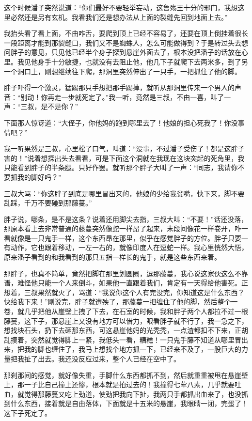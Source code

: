 这个时候潘子突然说道：“你们最好不要轻举妄动，这鲁殇王十分的邪门，我想这里必然还是另有玄机。我看我们还是想办法从上面的裂缝先回到地面上去。”

我抬头看了看上面，不由咋舌，要爬到顶上已经不容易了，还要在顶上倒挂着很长一段距离才能到那裂缝口，我们又不是蜘蛛人，怎么可能做得到？于是转过头去想问胖子的意见，只见他已经半个身子探到悬崖外面去了，根本没把潘子的话放在心里。我见他身手十分敏捷，也就没有去阻止他，他几下子就爬下去两米多，到了另一个洞口上，刚想继续往下爬，那洞里突然伸出了一只手，一把抓住了他的脚。

胖子吓得一个激灵，猛踢那只手想把那手踢掉，就听从那洞里传来一个男人的声音：“别动！你再走一步就死定了。”我一听，竟然是三叔，不由一喜，叫了一声：“三叔，是不是你？”

下面那人惊讶道：“大侄子，你他妈的跑到哪里去了！他娘的担心死我了！你没事情吧？”

我一听果然是三叔，心里松了口气，叫道：“没事，不过潘子受伤了！都是这胖子害的！”说着想探出头去看看，可是下面这个洞就在我现在这块突起的死角里，我只能看到胖子的半条腿。只好作罢。就听那个胖子大叫了一声：“同志，我请你不要抓我的脚好吗？”

三叔大骂：“你这胖子到底是哪里冒出来的，他娘的少给我贫嘴，快下来，脚不要乱踩，千万不要碰到那藤蔓。”

胖子说，哪条，是不是这条？说着还用脚尖去指，三叔大叫：“不要！”话还没落，那原本看上去非常普通的藤蔓突然像蛇一样昂了起来，末段间像花一样卷开，咋一看就像是一只鬼手一样，这个东西昂在那里，似乎在感觉胖子的方位。胖子只要一有动作，它也跟着移动，一左一右的，就像印度人在逗蛇一样。我心里恍然大悟，原来潘子看到的和我看到的那只五指一样长的鬼手，就是这些东西来着。

那胖子，也真不简单，竟然把脚在那里划圆圈，逗那藤蔓，我心说这家伙这么不靠谱，难怪他只能一个人来倒斗，如果他一直跟着我们，肯定有一天得给他害死。正想着，三叔果然就火了，骂道：“我说你这个人有完没完，你知道这是什么东西？快给我下来！”刚说完，胖子就遭殃了，那藤蔓一把缠住了他的脚，然后整个一卷，就几乎把他从崖壁上拽了下去，在石室的时候，我和胖子两个人都拉不过一根藤蔓，这下子，那悬崖上又没有地方可以借力，眼看胖子就不行了，我一急之下，想找块石头，扔下去砸那东西，可这悬崖他妈的光秃秃，一点渣都扣不下来，正胡乱摸着，突然就觉得脚上一紧，我低头一看，糟糕！一只鬼手藤不知道从哪里冒出来，把我的脚也缠住了，我马上想找个地方抓一下，已经来不及了，一股巨大的力量把我扯了出去。我还没反应过来，整个人已经在空中了。

那刹那间的感觉，就好像失重，手脚什么东西都抓不到，然后就重重被甩在悬崖壁上，那一子比自己撞上还惨，根本就是拍过去的！我撞得七荤八素，几乎就要吐血，就觉得那藤蔓又吃上劲道，使劲把我向下扯，我两只手都抓出血来了，也没抓到什么东西，接着就是自由落体，下面就是十五米的悬崖，我眼睛一闭，完蛋了！这下子死定了。

